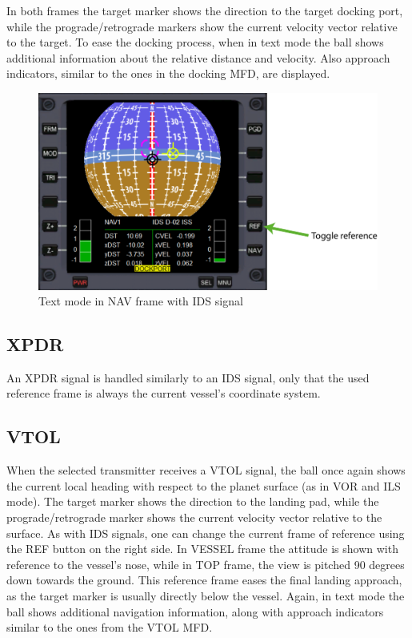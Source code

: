 \documentclass[paper=a4, 11 pt]{report}
\begin{document}
In both frames the target marker shows the direction to the target docking port, while the prograde/retrograde markers show the current velocity vector relative to the target.
To ease the docking process, when in text mode the ball shows additional information about the relative distance and velocity.
Also approach indicators, similar to the ones in the docking MFD, are displayed.

\begin{figure}[h]
	\centering
	\includegraphics[width=\textwidth]{4_ids_2.pdf}
	\caption{Text mode in NAV frame with IDS signal}
	\label{fig:ids}
\end{figure}

\subsection{XPDR}
An XPDR signal is handled similarly to an IDS signal, only that the used reference frame is always the current vessel's coordinate system.

\subsection{VTOL}
When the selected transmitter receives a VTOL signal, the ball once again shows the current local heading with respect to the planet surface (as in VOR and ILS mode).
The target marker shows the direction to the landing pad, while the prograde/retrograde marker shows the current velocity vector relative to the surface.
As with IDS signals, one can change the current frame of reference using the REF button on the right side.
In VESSEL frame the attitude is shown with reference to the vessel's nose, while in TOP frame, the view is pitched 90 degrees down towards the ground.
This reference frame eases the final landing approach, as the target marker is usually directly below the vessel.
Again, in text mode the ball shows additional navigation information, along with approach indicators similar to the ones from the VTOL MFD.
\end{document}
